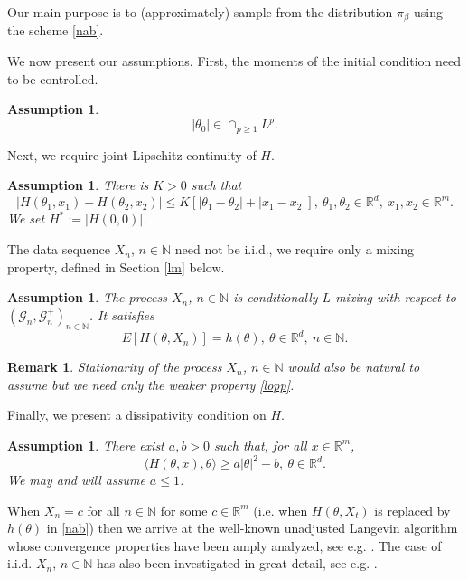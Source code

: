 \documentclass[a4paper,draft]{article}
\newtheorem{remark}[theorem]{Remark}
\newtheorem{assumption}[theorem]{Assumption}
\begin{document}
Our main purpose is to (approximately) sample from the distribution $\pi_{\beta}$ using the
scheme \eqref{nab}.

We now present our assumptions. First, the moments of the initial condition need to 
be controlled.

\begin{assumption}\label{imit}
$$
|\theta_0|\in\cap_{p\geq 1} L^p.
$$
\end{assumption}

Next, we require joint Lipschitz-continuity of $H$.

\begin{assumption}\label{lip} There is $K>0$ such that
$$
|H(\theta_1,x_1)-H(\theta_2,x_2)|\leq K[|\theta_1-\theta_2|+|x_1-x_2|],\ \theta_1,\theta_2\in\mathbb{R}^d,
\ x_1,x_2\in\mathbb{R}^m.
$$
We set $H^*:=|H(0,0)|$.
\end{assumption}

The data sequence $X_n$, $n\in\mathbb{N}$ need not be i.i.d., we require 
only a mixing property, defined in Section \ref{lm} below.
 
\begin{assumption}\label{lmiu}
The process $X_n$, $n\in\mathbb{N}$ is conditionally $L$-mixing with respect to
$(\mathcal{G}_n,\mathcal{G}^+_n)_{n\in\mathbb{N}}$. It satisfies
\begin{equation}\label{lopp}
E[H(\theta,X_n)]=h(\theta),\ \theta\in\mathbb{R}^d,\ n\in\mathbb{N}.
\end{equation}
\end{assumption}

\begin{remark}{\rm Stationarity of the process $X_n$, 
$n\in\mathbb{N}$ would also be natural to assume but we need only
the weaker property \eqref{lopp}.}
\end{remark}

Finally, we present a dissipativity condition on $H$.

\begin{assumption}\label{dissipativity}
There exist $a,b>0$ such that, for all $x\in\mathbb{R}^m$,
\begin{equation}\label{principal}
\langle H(\theta,x),\theta\rangle\geq a |\theta|^2-b,\ \theta\in\mathbb{R}^d.
\end{equation}
We may and will assume $a\leq 1$.
\end{assumption}

When $X_n=c$ for all $n\in\mathbb{N}$ for some $c\in\mathbb{R}^m$  
(i.e. when $H(\theta,X_t)$ is replaced by $h(\theta)$
in \eqref{nab}) then we arrive at the well-known unadjusted Langevin algorithm
whose convergence properties have been amply analyzed, see e.g.
\cite{dalalyan,unadjusted,berkeley,alex}. The case of i.i.d.
$X_n$, $n\in\mathbb{N}$ has also been
investigated in great detail, see e.g. \cite{raginsky,xu,alex}.
\end{document}
